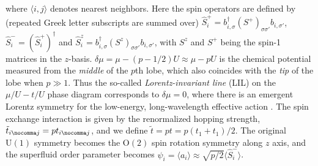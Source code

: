 where $\langle i, j \rangle$ denotes nearest neighbors.
Here the spin operators are defined by (repeated Greek letter subscripts are summed over) $\hat{S}_i^+ = b_{i, \sigma}^{\dag} (S^+)_{\sigma \sigma'} b_{i, \sigma'}$,
$\hat{S}_i^- = (\hat{S}_i^+)^{\dag}$ and $\hat{S}_i^z = b_{i, \sigma}^{\dag} (S^z)_{\sigma \sigma'} b_{i, \sigma'}$,
with $S^z$ and $S^+$ being the spin-1 matrices in the $z$-basis.
$\delta \mu = \mu - (p - 1 / 2)U \approx \mu - pU$ is the chemical potential measured from the \emph{middle} of the $p$th lobe,
which also coincides with the \emph{tip} of the lobe when $p \gg 1$.
Thus the so-called \emph{Lorentz-invariant line} (LIL) on the $\mu / U - t / U$ phase diagram corresponds to $\delta \mu = 0$,
where there is an emergent Lorentz symmetry for the low-energy,
long-wavelength effective action \cite{Sachdev2017}.
The spin exchange interaction is given by the renormalized hopping strength, $\tilde{t}_{i \nocomma j} = pt_{i \nocomma j}$,
and we define $\tilde{t} = pt = p(t_1+t_1)/2$.
The original $\mathrm{U} (1)$ symmetry becomes the $\mathrm{O} (2)$ spin rotation symmetry along $z$ axis,
and the superfluid order parameter becomes $\psi_i = \langle a_i \rangle \approx \sqrt{p / 2} \langle \hat{S}_i^- \rangle$.

